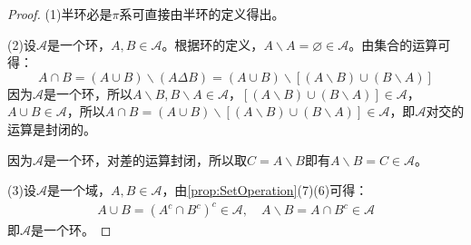 \begin{proof}
	(1)半环必是$\pi$系可直接由半环的定义得出。\par
	(2)设$\mathscr{A}$是一个环，$A,B\in\mathscr{A}$。根据环的定义，$A\backslash A=\varnothing\in\mathscr{A}$。由集合的运算可得：
	\begin{equation*}
		A\cap B=(A\cup B)\backslash(A\Delta B)=(A\cup B)\backslash[(A\backslash B)\cup(B\backslash A)] 
	\end{equation*}
	因为$\mathscr{A}$是一个环，所以$A\backslash B,B\backslash A\in\mathscr{A}$，$[(A\backslash B)\cup(B\backslash A)]\in\mathscr{A}$，$A\cup B\in\mathscr{A}$，所以$A\cap B=(A\cup B)\backslash[(A\backslash B)\cup(B\backslash A)]\in\mathscr{A}$，即$\mathscr{A}$对交的运算是封闭的。\par
	因为$\mathscr{A}$是一个环，对差的运算封闭，所以取$C=A\backslash B$即有$A\backslash B=C\in\mathscr{A}$。\par
	(3)设$\mathscr{A}$是一个域，$A,B\in\mathscr{A}$，由\cref{prop:SetOperation}(7)(6)可得：
	\begin{gather*}
		A\cup B=(A^c\cap B^c)^c\in\mathscr{A},\quad A\backslash B=A\cap B^c\in\mathscr{A}
	\end{gather*}
	即$\mathscr{A}$是一个环。
\end{proof}
